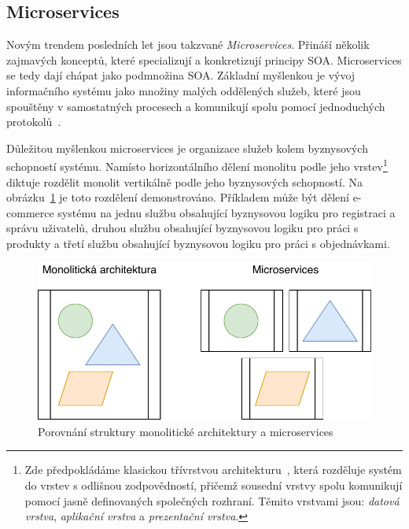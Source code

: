 \subsection{Microservices}

Novým trendem posledních let jsou takzvané \textit{Microservices}.
Přináší několik zajmavých konceptů, které specializují a konkretizují
principy SOA. Microservices se tedy dají chápat jako podmnožina
SOA. Základní myšlenkou je vývoj informačního systému jako množiny
malých oddělených služeb, které jsou spouštěny v samostatných procesech
a komunikují spolu pomocí jednoduchých protokolů~\cite{lewis2014microservices}.

Důležitou myšlenkou microservices je organizace služeb kolem
byznysových schopností systému. Namísto horizontálního dělení monolitu
podle jeho vrstev\footnote{
Zde předpokládáme klasickou třívrstvou architekturu~\cite{fowler2002patterns},
která rozděluje systém do vrstev s odlišnou zodpovědností,
přičemž sousední vrstvy spolu komunikují pomocí jasně definovaných společných rozhraní.
Těmito vrstvami jsou: \textit{datová vrstva}, \textit{aplikační vrstva} a \textit{prezentační vrstva}.
} diktuje rozdělit monolit vertikálně podle jeho byznysových schopností.
Na obrázku~\ref{fig:monolith-vs-microservices} je toto rozdělení demonstrováno.
Příkladem může být dělení e-commerce systému na jednu službu obsahující byznysovou
logiku pro registraci a správu uživatelů, druhou službu obsahující byznysovou logiku
pro práci s produkty a třetí službu obsahující byznysovou logiku pro práci
s objednávkami.

\begin{figure}
    \centering
    \includegraphics[keepaspectratio=true, width=0.8\linewidth]{figures/monolith-vs-microservices.pdf}
    \caption{Porovnání struktury monolitické architektury a microservices}
    \label{fig:monolith-vs-microservices}
\end{figure}

